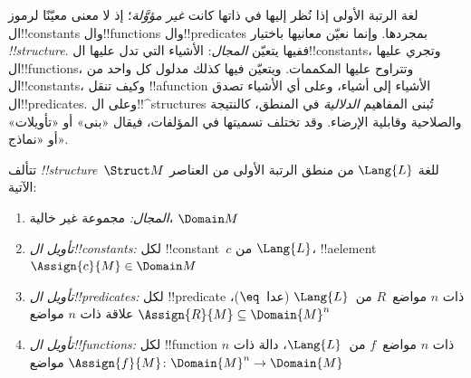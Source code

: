 \documentclass[../../../include/open-logic-section]{subfiles}
\begin{document}


\begin{explain}
لغة الرتبة الأولى إذا نُظر إليها في ذاتها كانت \emph{غير مؤوَّلة}؛
إذ لا معنى معيّنًا لرموز ال!!{constant}s وال!!{function}s
وال!!{predicate}s بمجردها. وإنما نعيّن معانيها باختيار
 \emph{!!{structure}}. ففيها يتعيّن
\emph{المجال}: الأشياء التي تدل عليها ال!!{constant}s، وتجري
عليها ال!!{function}s، وتتراوح عليها المكممات. ويتعيّن فيها كذلك
مدلول كل واحد من ال!!{constant}s، وكيف تنقل !!a{function} الأشياء
إلى أشياء، وعلى أي الأشياء تصدق ال!!{predicate}s.
وعلى ال!!^{structure}s تُبنى المفاهيم \emph{الدلالية} في المنطق،
كالنتيجة والصلاحية وقابلية الإرضاء. وقد تختلف تسميتها في
المؤلفات، فيقال «بنى» أو «تأويلات» أو «نماذج».
\end{explain}

\begin{defn}[!!^{structure}s]
تتألف  \emph{!!{structure}}~$\Struct M$ للغة
$\Lang{L}$ من منطق الرتبة الأولى من العناصر الآتية:
\begin{enumerate}
\item \emph{المجال:} مجموعة غير خالية، $\Domain M$
\item \emph{تأويل ال!!{constant}s:} لكل !!{constant}~$c$ من
  $\Lang{L}$، !!a{element}~$\Assign{c}{M} \in \Domain M$
\item \emph{تأويل ال!!{predicate}s:} لكل !!{predicate} ذات
  $n$ مواضع~$R$ من~$\Lang{L}$ (عدا~$\eq$)، علاقة ذات $n$ مواضع
  $\Assign{R}{M} \subseteq \Domain{M}^n$
\item \emph{تأويل ال!!{function}s:} لكل !!{function} ذات
  $n$ مواضع~$f$ من~$\Lang{L}$، دالة ذات $n$ مواضع
  $\Assign{f}{M} \colon \Domain{M}^n \to \Domain{M}$
\end{enumerate}
\end{defn}
\end{document}
